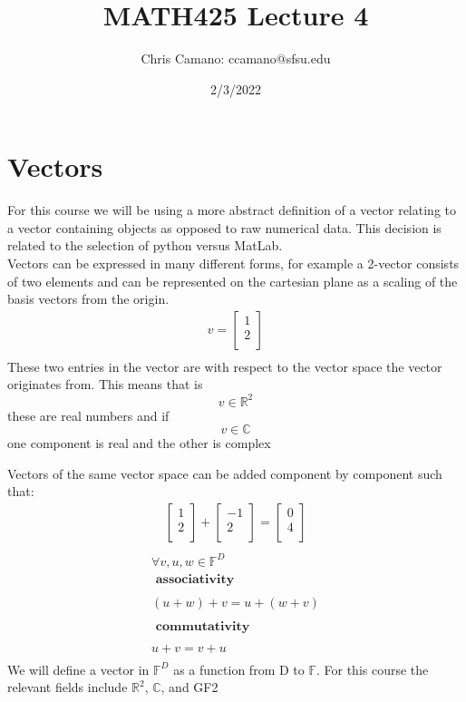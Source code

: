 \documentclass[12pt,a4paper]{article}
\author{Chris Camano: ccamano@sfsu.edu}
\title{MATH425 Lecture 4 }
\date{2/3/2022}
\newcommand{\rtwo}{$\mathbb{R}^2$}
\begin{document}
\maketitle

\section{Vectors}
For this course we will be using a more abstract definition of a vector relating to a vector containing objects as opposed to raw numerical data. This decision is related to the selection of python versus MatLab. \\

Vectors can be expressed in many different forms, for example a 2-vector consists of two elements and can be represented on the cartesian plane as a scaling of the basis vectors from the origin.
\begin{align*}
  v=
  \begin{bmatrix}
            1 \\
            2 \\
  \end{bmatrix}\\
\end{align*}
These two entries in the vector are with respect to the vector space the vector originates from. This means that is $$ v \in \mathbb{R}^2$$ these are real numbers and if $$ v \in \mathbb{C} $$ one component is real and the other is complex

Vectors of the same vector space can be added component by component such that: \
\begin{align*}
  \begin{bmatrix}
            1 \\
            2 \\
  \end{bmatrix}
  +
  \begin{bmatrix}
            -1 \\
            2 \\
  \end{bmatrix}
  =
  \begin{bmatrix}
            0 \\
            4 \\
  \end{bmatrix}\\
\end{align*}
\begin{align*}
  \forall v,u,w \in \mathbb{F}^D\\
  \textbf{  associativity}\\\\
  (u+w)+v=u+(w+v)  \\\\
  \textbf{  commutativity}\\\\
  u+v=v+u \\
\end{align*}
We will define a vector in $\mathbb{F}^D$ as a function from D to $\mathbb{F}$. For this course the relevant fields include \rtwo,  $\mathbb{C}$, and GF2\\
\end{document}
